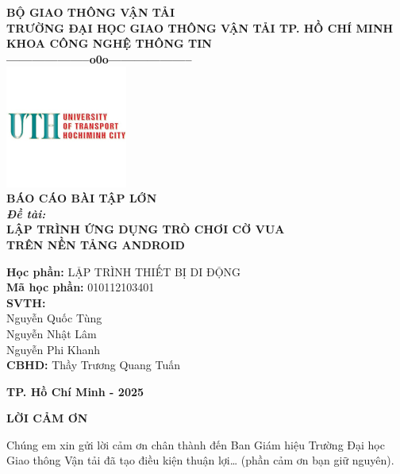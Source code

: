 \documentclass[a4paper,12pt]{article}
\begin{document}
\thispagestyle{empty}
\begin{center}
  \textbf{BỘ GIAO THÔNG VẬN TẢI}\\
  \textbf{TRƯỜNG ĐẠI HỌC GIAO THÔNG VẬN TẢI TP. HỒ CHÍ MINH}\\
  \textbf{KHOA CÔNG NGHỆ THÔNG TIN}\\
  \textbf{--------------------o0o--------------------}\\[1.5cm]

  \includegraphics[width=0.3\textwidth]{img/logo_uth.png}\\[1.5cm]

  \textbf{\LARGE BÁO CÁO BÀI TẬP LỚN}\\[1cm]
  \textbf{\large \textit{Đề tài:}}\\[0.5cm]
  \textbf{\Large LẬP TRÌNH ỨNG DỤNG TRÒ CHƠI CỜ VUA}\\[0.2cm]
  \textbf{\Large TRÊN NỀN TẢNG ANDROID}\\[1cm]

  \begin{flushleft}
    \textbf{\large Học phần:} LẬP TRÌNH THIẾT BỊ DI ĐỘNG\\[0.5cm]
    \textbf{\large Mã học phần:} 010112103401\\[1cm]
    \hspace{5cm}\textbf{\large SVTH:}\\
    \hspace{5cm} Nguyễn Quốc Tùng\\
    \hspace{5cm} Nguyễn Nhật Lâm\\
    \hspace{5cm} Nguyễn Phi Khanh\\[1cm]
    \hspace{5cm}\textbf{\large CBHD:} Thầy Trương Quang Tuấn\\[2cm]
  \end{flushleft}

  \textbf{TP. Hồ Chí Minh - 2025}
\end{center}

\newpage
\thispagestyle{empty}
\begin{center}
  \textbf{\Large LỜI CẢM ƠN}
\end{center}
\onehalfspacing
\justify
\noindent
Chúng em xin gửi lời cảm ơn chân thành đến Ban Giám hiệu Trường Đại học Giao thông Vận tải đã tạo điều kiện thuận lợi… (phần cảm ơn bạn giữ nguyên).
\end{document}
